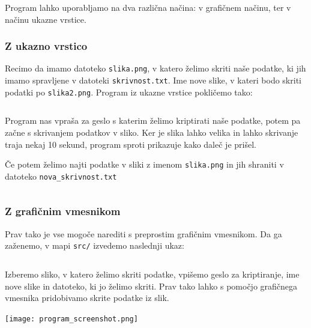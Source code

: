     Program lahko uporabljamo na dva različna načina: v grafičnem načinu, ter v načinu ukazne vrstice.

    \subsubsection{Z ukazno vrstico}

        Recimo da imamo datoteko \texttt{slika.png}, v katero želimo skriti naše podatke, ki jih imamo spravljene v datoteki \texttt{skrivnost.txt}. Ime nove slike, v kateri bodo skriti podatki po \texttt{slika2.png}. Program iz ukazne vrstice pokličemo tako:

        \inputminted[firstline=4, lastline=5, frame=lines]{bash}{latex/bashscripts.sh}

        Program nas vpraša za geslo s katerim želimo kriptirati naše podatke, potem pa začne s skrivanjem podatkov v sliko. Ker je slika lahko velika in lahko skrivanje traja nekaj 10 sekund, program sproti prikazuje kako daleč je prišel.

        Če potem želimo najti podatke v sliki z imenom \texttt{slika.png} in jih shraniti v datoteko \texttt{nova\_skrivnost.txt}

        \inputminted[firstline=7, lastline=7, frame=lines]{bash}{latex/bashscripts.sh}

    \subsubsection{Z grafičnim vmesnikom}
        Prav tako je vse mogoče narediti s preprostim grafičnim vmesnikom. Da ga zaženemo, v mapi \texttt{src/} izvedemo naslednji ukaz:

        \inputminted[firstline=9, lastline=9, frame=lines]{bash}{latex/bashscripts.sh}

        Izberemo sliko, v katero želimo skriti podatke, vpišemo geslo za kriptiranje, ime nove slike in datoteko, ki jo želimo skriti. Prav tako lahko s pomočjo grafičnega vmesnika pridobivamo skrite podatke iz slik.

        \centering
        \texttt{[image: program\_screenshot.png]}
